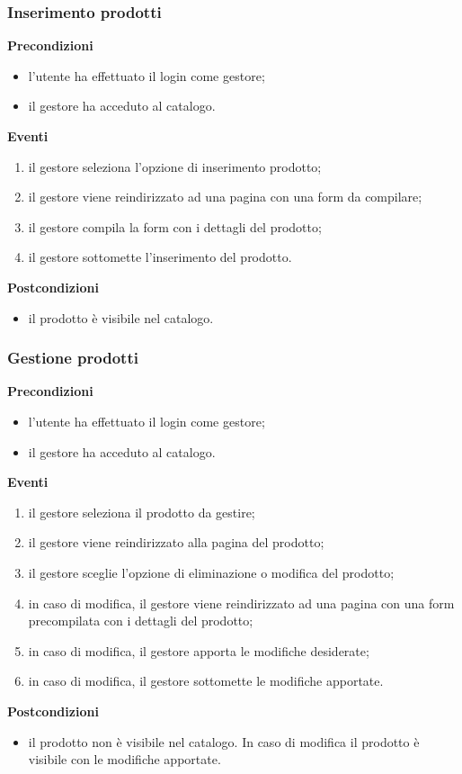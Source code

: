 \documentclass[a4paper, 14pt]{article}
\begin{document}
\begin{flushleft}
			\bigskip
			\subsubsection{Inserimento prodotti}
			\textbf{Precondizioni}
			\begin{itemize}
				\item l'utente ha effettuato il login come gestore;
				\item il gestore ha acceduto al catalogo.
			\end{itemize}
			\textbf{Eventi}
			\begin{enumerate}
				\item il gestore seleziona l'opzione di inserimento prodotto;
				\item il gestore viene reindirizzato ad una pagina con una form da compilare;
				\item il gestore compila la form con i dettagli del prodotto;
				\item il gestore sottomette l'inserimento del prodotto.
			\end{enumerate}
			\textbf{Postcondizioni}
			\begin{itemize}
				\item il prodotto è visibile nel catalogo.
			\end{itemize}
			
			\bigskip
			\subsubsection{Gestione prodotti}
			\textbf{Precondizioni}
			\begin{itemize}
				\item l'utente ha effettuato il login come gestore;
				\item il gestore ha acceduto al catalogo.
			\end{itemize}
			\textbf{Eventi}
			\begin{enumerate}
				\item il gestore seleziona il prodotto da gestire;
				\item il gestore viene reindirizzato alla pagina del prodotto;
				\item il gestore sceglie l'opzione di eliminazione o modifica del prodotto;
				\item in caso di modifica, il gestore viene reindirizzato ad una pagina con una form precompilata con i dettagli del prodotto;
				\item in caso di modifica, il gestore apporta le modifiche desiderate;
				\item in caso di modifica, il gestore sottomette le modifiche apportate.
			\end{enumerate}
			\textbf{Postcondizioni}
			\begin{itemize}
				\item il prodotto non è visibile nel catalogo. In caso di modifica il prodotto è visibile con le modifiche apportate.
			\end{itemize}
		

\end{flushleft}
\end{document}
